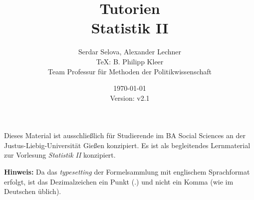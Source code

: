 \documentclass[11pt,a4paper]{article}
\author{Serdar Selova, Alexander Lechner \\ \TeX: B. Philipp Kleer \\ \footnotesize Team Professur für Methoden der Politikwissenschaft}
\title{%
  Tutorien\\
  \normalsize Statistik II \\
  }
\date{\today \\ \small{Version: v2.1}}
\begin{document}
\maketitle

Dieses Material ist ausschließlich für Studierende im BA Social Sciences an der Justus-Liebig-Universität Gießen konzipiert. Es ist als begleitendes Lernmaterial zur Vorlesung \textit{Statistik II} konzipiert.

\textbf{Hinweis:} Da das \textit{typesetting} der Formelsammlung mit englischem Sprachformat erfolgt, ist das Dezimalzeichen ein Punkt ($.$) und nicht ein Komma (wie im Deutschen üblich).

\tableofcontents 

\newpage



\newpage



\newpage



\newpage



\newpage



\newpage



\newpage

%

\newpage

%

\newpage

%
\end{document}
